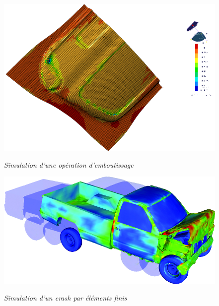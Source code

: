 \documentclass[11pt,oneside]{article}
\begin{document}
\begin{exemple}
\noindent\begin{minipage}[c]{.45\linewidth}
\begin{center}
\includegraphics[width=\textwidth]{png/simu_emboutissage_p}

\textit{Simulation d'une opération d'emboutissage}\cite{embouti}
\end{center}
\end{minipage} \hfill
\begin{minipage}[c]{.45\linewidth}
\begin{center}
\includegraphics[width=\textwidth]{png/crash_p}

\textit{Simulation d'un crash par éléments finis}\cite{ef}
\end{center}
\end{minipage}



\end{exemple}
\end{document}

